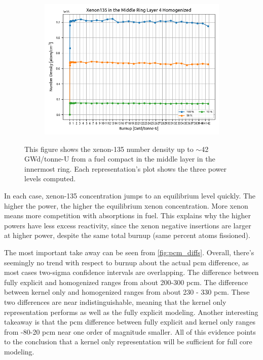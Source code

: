 \documentclass[letterpaper]{physor2024}
\begin{document}
\begin{figure}[!h]
\begin{subfigure}{0.495\linewidth}
        \includegraphics[width=\linewidth]{figures/homog_xe135.png}
    \end{subfigure}
    \caption{This figure shows the xenon-135 number density up to $\sim$42 GWd/tonne-U from a fuel compact in the middle layer in the innermost ring. Each representation's plot shows the three power levels computed.}
    \label{fig:xenons}
\end{figure}

In each case, xenon-135 concentration jumps to an equilibrium level quickly. The higher the power, the higher the equilibrium xenon concentration. More xenon means more competition with absorptions in fuel. This explains why the higher powers have less excess reactivity, since the xenon negative insertions are larger at higher power, despite the same total burnup (same percent atoms fissioned).

The most important take away can be seen from \cref{fig:pcm_diffs}. Overall, there's seemingly no trend with respect to burnup about the actual pcm difference, as most cases two-sigma confidence intervals are overlapping. The difference between fully explicit and homogenized ranges from about 200-300 \gls{pcm}. The difference between kernel only and homogenized ranges from about 230 - 330 \gls{pcm}. These two differences are near indistinguishable, meaning that the kernel only representation performs as well as the fully explicit modeling. Another interesting takeaway is that the pcm difference between fully explicit and kernel only ranges from -80-20 \gls{pcm} near one order of magnitude smaller. All of this evidence points to the conclusion that a kernel only representation will be sufficient for full core modeling.
\end{document}
